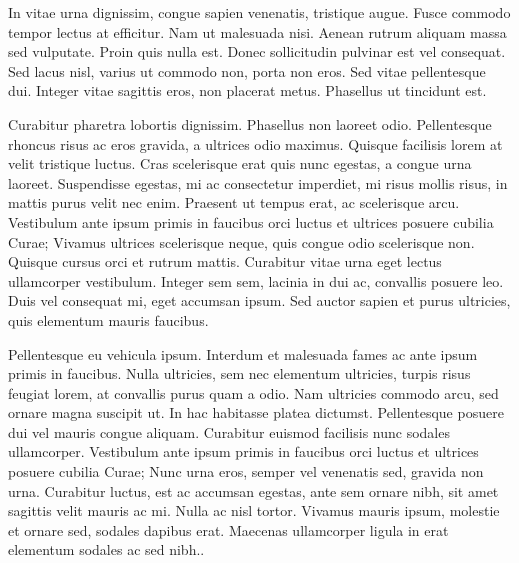 In vitae urna dignissim, congue sapien venenatis, tristique augue. Fusce commodo tempor lectus at efficitur. Nam ut malesuada nisi. Aenean rutrum aliquam massa sed vulputate. Proin quis nulla est. Donec sollicitudin pulvinar est vel consequat. Sed lacus nisl, varius ut commodo non, porta non eros. Sed vitae pellentesque dui. Integer vitae sagittis eros, non placerat metus. Phasellus ut tincidunt est.

Curabitur pharetra lobortis dignissim. Phasellus non laoreet odio. Pellentesque rhoncus risus ac eros gravida, a ultrices odio maximus. Quisque facilisis lorem at velit tristique luctus. Cras scelerisque erat quis nunc egestas, a congue urna laoreet. Suspendisse egestas, mi ac consectetur imperdiet, mi risus mollis risus, in mattis purus velit nec enim. Praesent ut tempus erat, ac scelerisque arcu. Vestibulum ante ipsum primis in faucibus orci luctus et ultrices posuere cubilia Curae; Vivamus ultrices scelerisque neque, quis congue odio scelerisque non. Quisque cursus orci et rutrum mattis. Curabitur vitae urna eget lectus ullamcorper vestibulum. Integer sem sem, lacinia in dui ac, convallis posuere leo. Duis vel consequat mi, eget accumsan ipsum. Sed auctor sapien et purus ultricies, quis elementum mauris faucibus.

Pellentesque eu vehicula ipsum. Interdum et malesuada fames ac ante ipsum primis in faucibus. Nulla ultricies, sem nec elementum ultricies, turpis risus feugiat lorem, at convallis purus quam a odio. Nam ultricies commodo arcu, sed ornare magna suscipit ut. In hac habitasse platea dictumst. Pellentesque posuere dui vel mauris congue aliquam. Curabitur euismod facilisis nunc sodales ullamcorper. Vestibulum ante ipsum primis in faucibus orci luctus et ultrices posuere cubilia Curae; Nunc urna eros, semper vel venenatis sed, gravida non urna. Curabitur luctus, est ac accumsan egestas, ante sem ornare nibh, sit amet sagittis velit mauris ac mi. Nulla ac nisl tortor. Vivamus mauris ipsum, molestie et ornare sed, sodales dapibus erat. Maecenas ullamcorper ligula in erat elementum sodales ac sed nibh..

